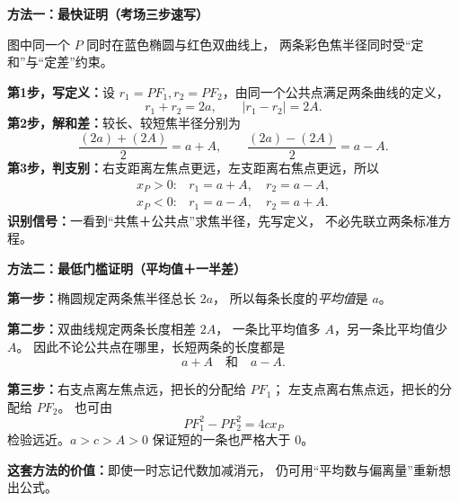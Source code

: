 \clearpage
\begin{proofbox}
\textbf{方法一：最快证明（考场三步速写）}

\begin{center}

\end{center}
图中同一个 $P$ 同时在蓝色椭圆与红色双曲线上，
两条彩色焦半径同时受“定和”与“定差”约束。

\textbf{第1步，写定义：}设 $r_1=PF_1,r_2=PF_2$，由同一个公共点满足两条曲线的定义，
\[r_1+r_2=2a,\qquad |r_1-r_2|=2A.\]
\textbf{第2步，解和差：}较长、较短焦半径分别为
\[
\frac{(2a)+(2A)}2=a+A,\qquad
\frac{(2a)-(2A)}2=a-A.
\]
\textbf{第3步，判支别：}右支距离左焦点更远，左支距离右焦点更远，所以
\[
\boxed{\begin{array}{ll}
x_P>0:&r_1=a+A,\quad r_2=a-A,\\[2pt]
x_P<0:&r_1=a-A,\quad r_2=a+A.
\end{array}}
\]
\textbf{识别信号：}一看到“共焦＋公共点”求焦半径，先写定义，
不必先联立两条标准方程。
\end{proofbox}

\clearpage
\begin{proofbox}
\textbf{方法二：最低门槛证明（平均值＋一半差）}

\begin{center}

\end{center}

\textbf{第一步：}椭圆规定两条焦半径总长 $2a$，
所以每条长度的\emph{平均值}是 $a$。

\textbf{第二步：}双曲线规定两条长度相差 $2A$，
一条比平均值多 $A$，另一条比平均值少 $A$。
因此不论公共点在哪里，长短两条的长度都是
\[\boxed{a+A\quad\text{和}\quad a-A}.\]

\textbf{第三步：}右支点离左焦点远，把长的分配给 $PF_1$；
左支点离右焦点远，把长的分配给 $PF_2$。
也可由
\[PF_1^2-PF_2^2=4cx_P\]
检验远近。$a>c>A>0$ 保证短的一条也严格大于 $0$。

\textbf{这套方法的价值：}即使一时忘记代数加减消元，
仍可用“平均数与偏离量”重新想出公式。
\end{proofbox}

